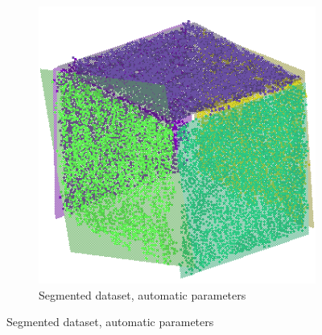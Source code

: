 \begin{figure}[htbp]
    \centering

    \begin{subfigure}[b]{0.5\textwidth}
        \centering
        \includegraphics[width=0.7\linewidth]{images/results_cube}
        \caption{Segmented dataset, automatic parameters}
        \label{fig:real-data-ransac-segmented}
    \end{subfigure}%

    \vspace{0.5em}


\end{figure}
